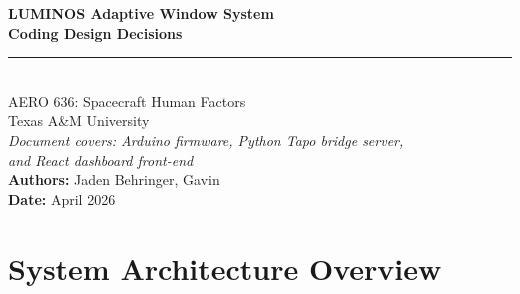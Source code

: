 \documentclass[12pt,letterpaper]{article}
\begin{document}
\begin{titlepage}
  \centering
  \vspace*{2cm}
  {\Huge\bfseries\color{headblue} LUMINOS Adaptive Window System\\[0.4em]
   \large Coding Design Decisions}\\[1.5em]
  \rule{\linewidth}{1pt}\\[1em]
  {\large AERO 636: Spacecraft Human Factors}\\[0.5em]
  {\large Texas A\&M University}\\[2em]
  {\normalsize\textit{Document covers: Arduino firmware, Python Tapo bridge server,}}\\
  {\normalsize\textit{and React dashboard front-end}}\\[3em]
  {\large\bfseries Authors:} Jaden Behringer, Gavin\\[0.5em]
  {\large\bfseries Date:} April 2026\\[3em]
  \vfill
  \begin{abstract}
    \noindent
    This document records the key software and firmware engineering decisions made
    during the development of the LUMINOS prototype, a subscale adaptive lighting
    system designed to improve circadian entrainment for ISS crew members. The
    system spans three software layers: (1) an Arduino microcontroller that reads
    an analog light-dependent resistor and drives a servo-actuated blue-light
    gel filter; (2) a Python HTTP bridge server that translates sensor data into
    closed-loop brightness commands sent to a TP-Link Tapo L530 smart bulb; and
    (3) a React web dashboard that provides real-time visualization, manual
    override, and a library of circadian lighting profiles. For each layer, this
    document explains what was chosen, what alternatives were considered, and why
    the chosen approach best satisfied the project's constraints of low cost,
    rapid prototyping, and demonstrable lux-control performance.
  \end{abstract}
\end{titlepage}

\tableofcontents
\newpage

\section{System Architecture Overview}
\end{document}
